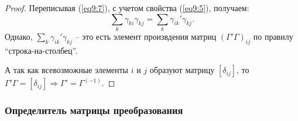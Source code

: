 	\begin{proof} 
	
	Переписывая (\ref{eq9:7}), с учетом свойства (\ref{eq9:5}), получаем:
	\begin{equation}
		\sum\limits_k \gamma_{ki}\gamma_{kj} = \sum\limits_k \gamma_{ik}'\gamma_{kj}. \nonumber
	\end{equation}
	Однако, \( \sum\limits_k \gamma_{ik}'\gamma_{kj} \) -- это есть элемент произвдения матриц \( ( \Gamma' \Gamma )_{ij} \) по правилу ``строка-на-столбец''.
	
	\begin{comment} Умножение матриц производится следующим образом:
	\[ \begin{array}{rl} \begin{bmatrix}
			a_{11} & a_{12} & a_{13} \\
			a_{21} & a_{22} & a_{23} \\
			a_{31} & a_{32} & a_{33}
	\end{bmatrix}	\cdot \begin{bmatrix}
			b_{11} & b_{12} & b_{13} \\
			b_{21} & b_{22} & b_{23} \\
			b_{31} & b_{32} & b_{33}
	\end{bmatrix} = & \begin{bmatrix}
			c_{11} & c_{12} & c_{13} \\
			c_{21} & c_{22} & c_{23} \\
			c_{31} & c_{32} & c_{33}
	\end{bmatrix} \\[0.5cm]
		c_{ij} = a_{i1}b_{1j} + a_{i2}b_{2j} + a_{i3}b_{3j} = & \sum\limits_{k=1}^3 a_{ik}b_{kj}
	\end{array} \]
	\end{comment}
	
	А так как всевозможные элементы \( i \) и \( j \) образуют матрицу \( [ \delta_{ij} ] \), то \( \Gamma'\Gamma = [ \delta_{ij} ] \Rightarrow \Gamma' = \Gamma^{(-1)} \).
	\end{proof}
	
\subsubsection{Определитель матрицы преобразования}
	
